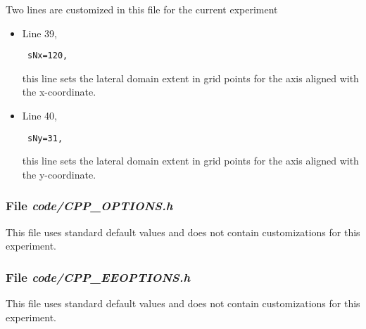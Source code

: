 Two lines are customized in this file for the current experiment

\begin{itemize}

\item Line 39, 
\begin{verbatim} sNx=120, \end{verbatim} this line sets
the lateral domain extent in grid points for the
axis aligned with the x-coordinate.

\item Line 40, 
\begin{verbatim} sNy=31, \end{verbatim} this line sets
the lateral domain extent in grid points for the
axis aligned with the y-coordinate.

\end{itemize}

\begin{small}

\end{small}

\subsubsection{File {\it code/CPP\_OPTIONS.h}}
\label{www:tutorials}

This file uses standard default values and does not contain
customizations for this experiment.


\subsubsection{File {\it code/CPP\_EEOPTIONS.h}}
\label{www:tutorials}

This file uses standard default values and does not contain
customizations for this experiment.

